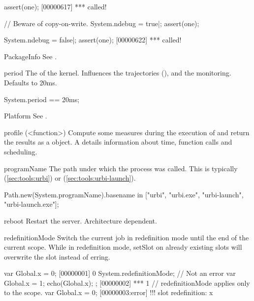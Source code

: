 \begin{urbiscriptapi}
\begin{urbiscript}
assert(one);
[00000617] *** called!

// Beware of copy-on-write.
System.ndebug = true|;
assert(one);

System.ndebug = false|;
assert(one);
[00000622] *** called!
\end{urbiscript}




\item[PackageInfo] See .


\item[period] The  of the \urbi kernel.  Influences the
  trajectories (), and the \UObject
  monitoring.  Defaults to 20ms.
\begin{urbiassert}
System.period == 20ms;
\end{urbiassert}


\item[Platform] See .

\item[profile](<function>)%
  Compute some measures during the execution of  and return
  the results as a  object. A  details
  information about time, function calls and scheduling.


\item[programName] The path under which the \urbi process was called.
  This is typically  (\autoref{sec:tools:urbi}) or
   (\autoref{sec:tools:urbi-launch}).
\begin{urbiassert}
Path.new(System.programName).basename
  in ["urbi", "urbi.exe", "urbi-launch", "urbi-launch.exe"];
\end{urbiassert}


\item[reboot] Restart the \urbi server.  Architecture dependent.


\item[redefinitionMode] Switch the current job in redefinition mode
  until the end of the current scope.  While in redefinition mode,
  setSlot on already existing slots will overwrite the slot instead of
  erring.

\begin{urbiscript}
var Global.x = 0;
[00000001] 0
{
  System.redefinitionMode;
  // Not an error
  var Global.x = 1;
  echo(Global.x);
};
[00000002] *** 1
// redefinitionMode applies only to the scope.
var Global.x = 0;
[00000003:error] !!! slot redefinition: x
\end{urbiscript}



\end{urbiscriptapi}

